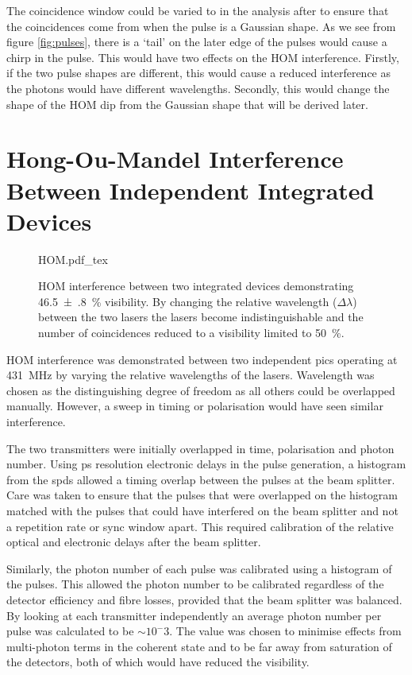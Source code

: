 The coincidence window could be varied to in the analysis after to ensure that the coincidences come from when the pulse is a Gaussian shape. As we see from figure \ref{fig:pulses}, there is a `tail' on the later edge of the pulses would cause a chirp in the pulse. This would have two effects on the \ac{HOM} interference. Firstly, if the two pulse shapes are different, this would cause a reduced interference as the photons would have different wavelengths. Secondly, this would change the shape of the \ac{HOM} dip from the Gaussian shape that will be derived later.

\section{Hong-Ou-Mandel Interference Between Independent Integrated Devices}

\begin{figure}[tbp]
	\centering
	\def\svgwidth{0.8\textwidth} 
	{HOM.pdf_tex}
	\caption[Hong-Ou-Mandel interference between integrated devices]{\ac{HOM} interference between two integrated devices demonstrating \SI{46.5(8)}{\%} visibility. By changing the relative wavelength ($\Delta\lambda$) between the two lasers the lasers become indistinguishable and the number of coincidences reduced to a visibility limited to \SI{50}{\percent}.}
	\label{fig:HOM}
\end{figure}

\acl{HOM} interference was demonstrated between two independent \acp{pic} operating at \SI{431}{\MHz} by varying the relative wavelengths of the lasers. Wavelength was chosen as the distinguishing degree of freedom as all others could be overlapped manually. However, a sweep in timing or polarisation would have seen similar interference. 

The two transmitters were initially overlapped in time, polarisation and photon number. Using ps resolution electronic delays in the pulse generation, a histogram from the \acp{spd} allowed a timing overlap between the pulses at the beam splitter. Care was taken to ensure that the pulses that were overlapped on the histogram matched with the pulses that could have interfered on the beam splitter and not a repetition rate or sync window apart. This required calibration of the relative optical and electronic delays after the beam splitter. 

Similarly, the photon number of each pulse was calibrated using a histogram of the pulses. This allowed the photon number to be calibrated regardless of the detector efficiency and fibre losses, provided that the beam splitter was balanced. By looking at each transmitter independently an average photon number per pulse was calculated to be $\sim 10^-3$. The value was chosen to minimise effects from multi-photon terms in the coherent state and to be far away from saturation of the detectors, both of which would have reduced the visibility.

